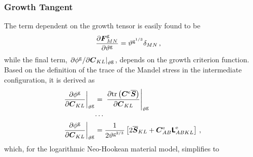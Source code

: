 \documentclass[10pt,letterpaper,oneside]{report}
\newcommand{\ten}[1]{\mbox{\boldmath $#1$}{}}
\newcommand{\tenf}[1]{\mbox{{\sffamily{\bfseries {#1}}}}}
\newcommand{\scas}[1]{\mbox{{\scriptsize{${\rm{#1}}$}}}{}}
\begin{document}
\begin{itemize}
\subsubsection{Growth Tangent}
The term dependent on the growth tensor is easily found to be
\begin{align}
\frac{\partial \ten{F}^{\scas{g}}_{MN} }{\partial \vartheta^{\scas{g}}} ={}& \vartheta^{\scas{g}^{1/3}} \delta_{MN} \, , 
\end{align}
while the final term, $ \left. \partial \phi^{\scas{g}} / \partial \ten{C}_{KL} \right|_{\vartheta^{\scas{g}}} $, depends on the growth criterion function.  Based on the definition of the trace of the Mandel stress in the intermediate configuration, it is derived as
\begin{align}
\left. \frac{ \partial \phi^{\scas{g}} }{ \partial \ten{C}_{KL} } \right|_{\vartheta^{\scas{g}}}  
={}& \left. \frac{ \partial \mbox{tr} \left( \ten{C}^{\scas{e}} \overline{\ten{S}} \right) }{ \partial \ten{C}_{KL} } \right|_{\vartheta^{\scas{g}}} 
\\
\cdots{}& \notag \\
\left. \frac{ \partial \phi^{\scas{g}} }{ \partial \ten{C}_{KL} } \right|_{\vartheta^{\scas{g}}}  
={}& \frac{1}{2 \vartheta^{\scas{g}^{2/3}}}\left[ 2 \overline{\ten{S}}_{KL} + \ten{C}^{\scas{e}}_{AB} \tenf{L}^{\scas{e}}_{ABKL} \right] \, , 
\end{align}
which, for the logarithmic Neo-Hookean material model, simplifies to

\end{itemize}
\end{document}
